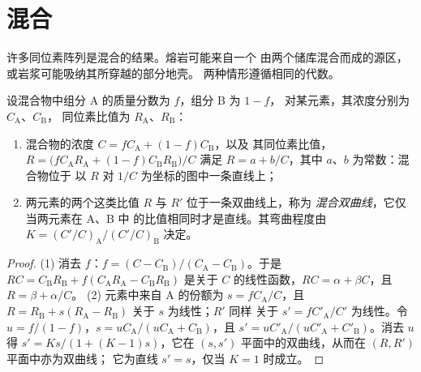\section{混合}

许多同位素阵列是混合的结果。熔岩可能来自一个
由两个储库混合而成的源区，或岩浆可能吸纳其所穿越的部分地壳。
两种情形遵循相同的代数。

\begin{proposition}[混合双曲线]\label{prop:b2:isotope-geochemistry:mixing}
设混合物中组分 A 的质量分数为 $f$，组分 B 为 $1-f$，
对某元素，其浓度分别为 $C_{\mathrm A}$、$C_{\mathrm B}$，
同位素比值为 $R_{\mathrm A}$、$R_{\mathrm B}$：
\begin{enumerate}
\item 混合物的浓度 $C = fC_{\mathrm A} + (1-f)C_{\mathrm B}$，以及
其同位素比值，
$R = \bigl(fC_{\mathrm A}R_{\mathrm A} + (1-f)C_{\mathrm B}R_{\mathrm B}\bigr)/C$ 满足
$R = a + b/C$，其中 $a$、$b$ 为常数：混合物位于
以 $R$ 对 $1/C$ 为坐标的图中一条直线上；
\item 两元素的两个这类比值 $R$ 与 $R'$ 位于一条双曲线上，称为
\emph{混合双曲线}，它仅当两元素在 A、B 中
的比值相同时才是直线。其弯曲程度由
$K = (C'/C)_{\mathrm A}/(C'/C)_{\mathrm B}$ 决定。
\end{enumerate}
\end{proposition}

\begin{proof}
(1) 消去 $f$：$f = (C - C_{\mathrm B})/(C_{\mathrm A} - C_{\mathrm B})$。于是
$RC = C_{\mathrm B}R_{\mathrm B} + f(C_{\mathrm A}R_{\mathrm A} - C_{\mathrm B}R_{\mathrm
B})$ 是关于 $C$ 的线性函数，$RC = \alpha + \beta C$，且 $R = \beta + \alpha/C$。
(2) 元素中来自 A 的份额为 $s = fC_{\mathrm A}/C$，且 $R =
R_{\mathrm B} + s(R_{\mathrm A} - R_{\mathrm B})$ 关于 $s$ 为线性；$R'$ 同样
关于 $s' = fC'_{\mathrm A}/C'$ 为线性。令 $u = f/(1-f)$，$s = u C_{\mathrm
A}/(uC_{\mathrm A} + C_{\mathrm B})$，且 $s' = uC'_{\mathrm A}/(uC'_{\mathrm A} +
C'_{\mathrm B})$。消去 $u$ 得 $s' = Ks/(1 + (K-1)s)$，它在
$(s, s')$ 平面中的双曲线，从而在 $(R, R')$ 平面中亦为双曲线；
它为直线 $s' = s$，仅当 $K = 1$ 时成立。
\end{proof}

